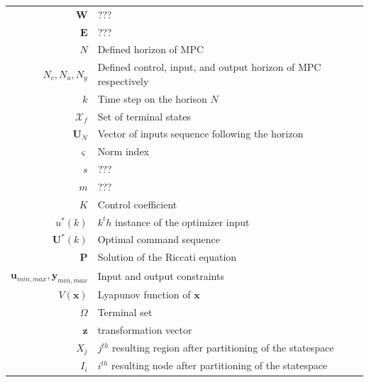 \begin{scriptsize}
\begin{tabularx}{\textwidth}{r|X}
	$\textbf{W}$																&???\\
	$\textbf{E}$																&???\\
	$N$											& Defined horizon of MPC\\
	$N_c,N_u,N_y$											& Defined control, input, and output horizon of MPC respectively\\
	$k$																& Time step on the horison $N$ \\
	$\mathcal{X}_f$															& Set of terminal states \\
	$\textbf{U}_N$										& Vector of inputs sequence following the horizon\\
	$\varsigma$											& Norm index\\
	$s$																& ???\\
	$m$																& ???\\
	$K$															& Control coefficient \\
	$u^*(k)$													& $k^th$ instance of the optimizer input\\
	$\textbf{U}^*(k)$									& Optimal command sequence\\
	$\textbf{P}$																& Solution of the Riccati equation\\
	$\textbf{u}_{min,max},\textbf{y}_{min,max}$					& Input and output constraints\\
	$V(\textbf{x})$														& Lyapunov function of $\textbf{x}$\\
	$\Omega$ 													& Terminal set\\
	$\textbf{z}$																& transformation vector\\
	$X_j$															& $j^{th}$ resulting region after partitioning of the statespace\\
	$I_i$															& $i^{th}$ resulting node after partitioning of the statespace\\
	
\end{tabularx}
\end{scriptsize}

%

